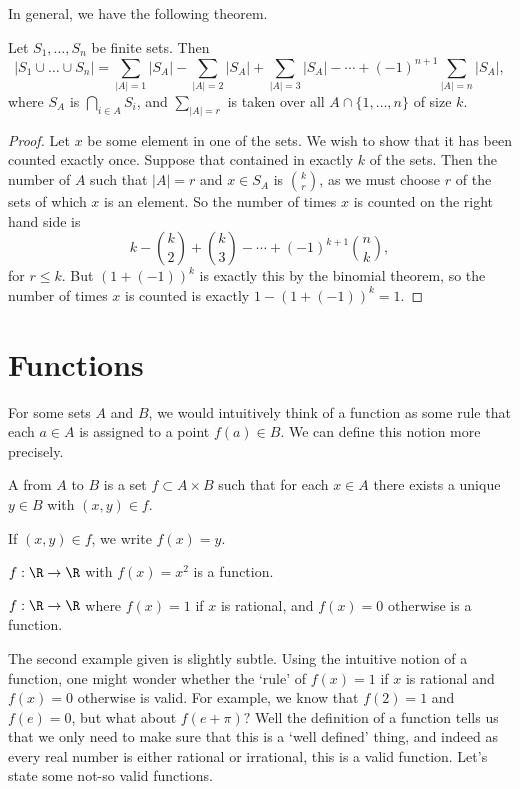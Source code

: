 \documentclass[a4paper]{scrreprt}
\begin{document}
In general, we have the following theorem.

\begin{theorem}
	Let $S_1, \dots, S_n$ be finite sets. Then
	$$
	|S_1 \cup \dots \cup S_n| = \sum_{|A| = 1} |S_A| - \sum_{|A| = 2} |S_A| + \sum_{|A| = 3} |S_A| - \cdots + (-1)^{n + 1} \sum_{|A| = n} |S_A|,
	$$
	where $S_A$ is $\bigcap_{i \in A} S_i$, and $\sum_{|A| = r}$ is taken over all $A \cap \{1, \dots, n\}$ of size $k$.
\end{theorem}
\begin{proof}
	Let $x$ be some element in one of the sets. We wish to show that it has been counted exactly once. Suppose that contained in exactly $k$ of the sets.
	Then the number of $A$ such that $|A| = r$ and $x \in S_A$ is $\binom{k}{r}$, as we must choose $r$ of the sets of which $x$ is an element.
	So the number of times $x$ is counted on the right hand side is
	$$
	k - \binom{k}{2} + \binom{k}{3} - \cdots + (-1)^{k + 1}\binom{n}{k},
	$$
	for $r \leq k$. But $(1 + (-1))^k$ is exactly this by the binomial theorem, so the number of times $x$ is counted is exactly $1 - (1 + (-1))^k = 1$.
\end{proof}

\section{Functions}

For some sets $A$ and $B$, we would intuitively think of a function as some rule that each $a \in A$ is assigned to a point $f(a) \in B$. We can define this notion more precisely.

\begin{definition}[Function]
	A  from $A$ to $B$ is a set $f \subset A \times B$ such that for each $x \in A$ there exists a unique $y \in B$ with $(x, y) \in f$.

	If $(x, y) \in f$, we write $f(x) = y$.
\end{definition}

\begin{example}
	$f: \R \rightarrow \R$ with $f(x) = x^2$ is a function.

	$f : \R \rightarrow \R$ where $f(x) = 1$ if $x$ is rational, and $f(x) = 0$ otherwise is a function.
\end{example}
The second example given is slightly subtle. Using the intuitive notion of a function, one might wonder whether the `rule' of $f(x) = 1$ if $x$ is rational and $f(x) = 0$ otherwise is valid. For example, we know that $f(2) = 1$ and $f(e) = 0$, but what about $f(e + \pi)?$ Well the definition of a function tells us that we only need to make sure that this is a `well defined' thing, and indeed as every real number is either rational or irrational, this is a valid function. Let's state some not-so valid functions.
\end{document}
